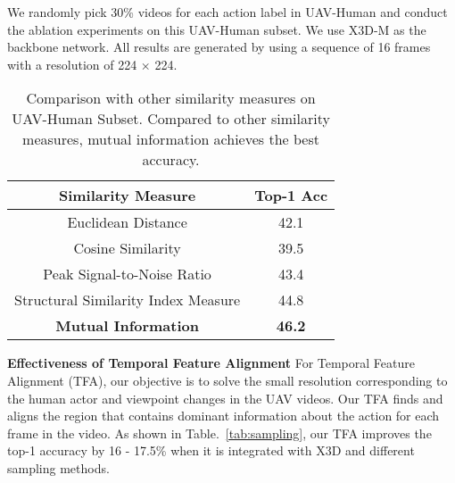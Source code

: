 \documentclass[10pt,twocolumn,letterpaper]{article}
\begin{document}
{We randomly pick 30\% videos for each action label in UAV-Human and conduct the ablation experiments on this UAV-Human subset. We use X3D-M\cite{feichtenhofer2020x3d} as the backbone network. All results are generated by using a sequence of 16 frames with a resolution of 224 × 224.


\begin{table}
\centering
\begin{center}
\vspace{-7pt}
\caption{Mutual Information Sampling (MIS) ablation studies on UAV-Human-subset and Drone Action. The baseline is vanilla X3D with TFA, we test the MITFAS Sampling in terms of  two hyperparameters for mutual information and joint mutual information,  and  respectively. From our experiments, MITFAS obtains the best accuracy when  and .  }
\vspace{-5pt}
\label{tab:sampling_ablation}
\end{center}
\end{table} \begin{table}
\centering
\begin{tabular}{c c }
\toprule
Similarity Measure  & Top-1 Acc  \\
\midrule
Euclidean Distance & 42.1  \\
Cosine Similarity &39.5  \\
Peak Signal-to-Noise Ratio & 43.4 \\
Structural Similarity Index Measure & 44.8  \\
\textbf{Mutual Information} & \textbf{46.2} \\

\bottomrule
\end{tabular}
\vspace{-7pt}
\caption{Comparison with other similarity measures on UAV-Human Subset. Compared to other similarity measures, mutual information achieves the best accuracy.}
\vspace{-8pt}
\label{tab:similarity}
\end{table} \textbf{Effectiveness of Temporal Feature Alignment} For Temporal Feature Alignment (TFA), our objective is to solve the small resolution corresponding to the human actor and viewpoint changes in the UAV videos. 
Our TFA finds and aligns the region that contains dominant information about the action for each frame in the video. As shown in Table.~\ref{tab:sampling}, our TFA improves the top-1 accuracy by 16 - 17.5\% when it is integrated with X3D and different sampling methods.

}
\end{document}
